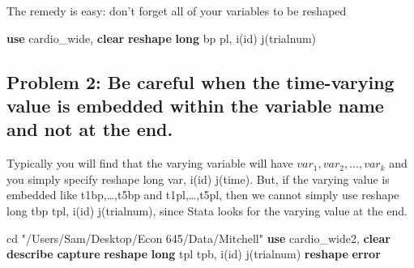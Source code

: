 \documentclass[
]{book}
\newenvironment{Shaded}{\begin{snugshade}}{\end{snugshade}}
\newcommand{\KeywordTok}[1]{\textcolor[rgb]{0.13,0.29,0.53}{\textbf{#1}}}
\newcommand{\NormalTok}[1]{#1}
\newcommand{\StringTok}[1]{\textcolor[rgb]{0.31,0.60,0.02}{#1}}
\begin{document}
The remedy is easy: don't forget all of your variables to be reshaped

\begin{Shaded}
\begin{Highlighting}[]
\KeywordTok{use}\NormalTok{ cardio\_wide, }\KeywordTok{clear}
\KeywordTok{reshape} \KeywordTok{long}\NormalTok{ bp pl, i(id) j(trialnum)}
\end{Highlighting}
\end{Shaded}

\subsection*{Problem 2: Be careful when the time-varying value is embedded within the variable name and not at the end.}\label{problem-2-be-careful-when-the-time-varying-value-is-embedded-within-the-variable-name-and-not-at-the-end.}

Typically you will find that the varying variable will have \(var_1, var_2, ..., var_k\) and you simply specify reshape long var, i(id) j(time). But, if the varying value is embedded like t1bp,\ldots,t5bp and t1pl,\ldots,t5pl, then we cannot simply use reshape long tbp tpl, i(id) j(trialnum), since Stata looks for the varying value at the end.

\begin{Shaded}
\begin{Highlighting}[]
\NormalTok{cd }\StringTok{"/Users/Sam/Desktop/Econ 645/Data/Mitchell"}
\KeywordTok{use}\NormalTok{ cardio\_wide2, }\KeywordTok{clear}
\KeywordTok{describe}
\KeywordTok{capture} \KeywordTok{reshape} \KeywordTok{long}\NormalTok{ tpl tpb, i(id) j(trialnum)}
\KeywordTok{reshape} \KeywordTok{error}
\end{Highlighting}
\end{Shaded}
\end{document}
